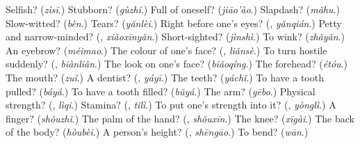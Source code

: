 \begin{tcolorbox}[breakable,colback=teal!4,colframe=teal!35!black,title={Before you move on}]
Selfish? (\emph{zìsī}.) Stubborn? (\emph{gùzhí}.) Full of oneself? (\emph{jiāo'ào}.) Slapdash? (\emph{mǎhu}.) Slow-witted? (\emph{bèn}.) Tears? (\emph{yǎnlèi}.) Right before one's eyes? (\textbf{}, \emph{yǎnqián}.) Petty and narrow-minded? (\textbf{}, \emph{xiǎoxīnyǎn}.) Short-sighted? (\emph{jìnshì}.) To wink? (\emph{zhǎyǎn}.) An eyebrow? (\emph{méimao}.) The colour of one's face? (\textbf{}, \emph{liǎnsè}.) To turn hostile suddenly? (\textbf{}, \emph{biànliǎn}.) The look on one's face? (\emph{biǎoqíng}.) The forehead? (\emph{étóu}.) The mouth? (\emph{zuǐ}.) A dentist? (\textbf{}, \emph{yáyī}.) The teeth? (\emph{yáchǐ}.) To have a tooth pulled? (\emph{báyá}.) To have a tooth filled? (\emph{bǔyá}.) The arm? (\emph{gēbo}.) Physical strength? (\textbf{}, \emph{lìqi}.) Stamina? (\textbf{}, \emph{tǐlì}.) To put one's strength into it? (\textbf{}, \emph{yònglì}.) A finger? (\emph{shǒuzhǐ}.) The palm of the hand? (\textbf{}, \emph{shǒuxīn}.) The knee? (\emph{xīgài}.) The back of the body? (\emph{hòubèi}.) A person's height? (\textbf{}, \emph{shēngāo}.) To bend? (\emph{wān}.)
\end{tcolorbox}
